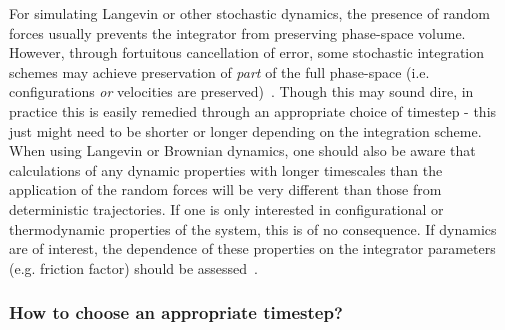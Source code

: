 \documentclass[9pt,bestpractices]{livecoms}
\begin{document}
For simulating Langevin or other stochastic dynamics, the presence of random forces usually prevents the integrator from preserving phase-space volume.
However, through fortuitous cancellation of error, some stochastic integration schemes may achieve preservation of \textit{part} of the full phase-space (i.e. configurations \textit{or} velocities are preserved)~\cite{Fass2018}.
Though this may sound dire, in practice this is easily remedied through an appropriate choice of timestep - this just might need to be shorter or longer depending on the integration scheme.
When using Langevin or Brownian dynamics, one should also be aware that calculations of any dynamic properties with longer timescales than the application of the random forces will be very different than those from deterministic trajectories.
If one is only interested in configurational or thermodynamic properties of the system, this is of no consequence.
If dynamics are of interest, the dependence of these properties on the integrator parameters (e.g. friction factor) should be assessed~\cite{Basconi:2013:JChemTheoryComput}.


\subsubsection{How to choose an appropriate timestep?}
\end{document}
